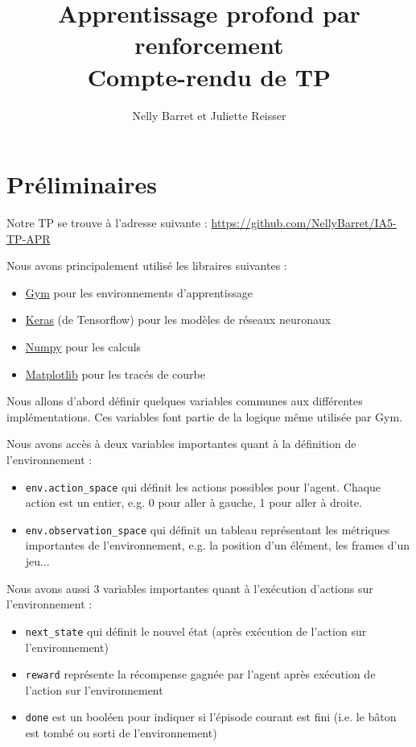 \documentclass[10pt,a4paper]{article}
\title{Apprentissage profond par renforcement \\ Compte-rendu de TP}
\author{Nelly Barret et Juliette Reisser}
\begin{document}
\maketitle

\section{Préliminaires}
Notre TP se trouve à l'adresse suivante : \href{https://github.com/NellyBarret/IA5-TP-APR}{https://github.com/NellyBarret/IA5-TP-APR}

Nous avons principalement utilisé les libraires suivantes :
\begin{itemize}
	\item \href{https://gym.openai.com/}{Gym} pour les environnements d'apprentissage
	\item \href{https://keras.io/}{Keras} (de Tensorflow) pour les modèles de réseaux neuronaux
	\item \href{https://numpy.org/}{Numpy} pour les calculs
	\item \href{https://matplotlib.org/index.html}{Matplotlib} pour les tracés de courbe
\end{itemize}

Nous allons d'abord définir quelques variables communes aux différentes implémentations. Ces variables font partie de la logique même utilisée par Gym.

Nous avons accès à deux variables importantes quant à la définition de l'environnement :
\begin{itemize}
	\item \lstinline{env.action_space} qui définit les actions possibles pour l'agent. Chaque action est un entier, e.g. 0 pour aller à gauche, 1 pour aller à droite.
	\item \lstinline{env.observation_space} qui définit un tableau représentant les métriques importantes de l'environnement, e.g. la position d'un élément, les frames d'un jeu...
\end{itemize}

Nous avons aussi 3 variables importantes quant à l'exécution d'actions sur l'environnement :
\begin{itemize}
	\item \lstinline{next_state} qui définit le nouvel état (après exécution de l'action sur l'environnement)
	\item \lstinline{reward} représente la récompense gagnée par l'agent après exécution de l'action sur l'environnement
	\item \lstinline{done} est un booléen pour indiquer si l'épisode courant est fini (i.e. le bâton est tombé ou sorti de l'environnement)
\end{itemize}
\end{document}
